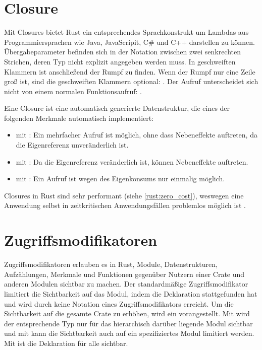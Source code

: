 \section{Closure}
\label{rust:closures}

Mit Closures bietet Rust ein entsprechendes Sprachkonstrukt um Lambdas aus Programmiersprachen wie Java, JavaScripit, C\# und C++ darstellen zu können.
Übergabeparameter befinden sich in der Notation zwischen zwei senkrechten Strichen, deren Typ nicht explizit angegeben werden muss.
In geschweiften Klammern ist anschließend der Rumpf zu finden.
Wenn der Rumpf nur eine Zeile groß ist, sind die geschweiften Klammern optional: .
Der Aufruf unterscheidet sich nicht von einem normalen Funktionsaufruf: .

Eine Closure ist eine automatisch generierte Datenstruktur, die eines der folgenden Merkmale automatisch implementiert:
\begin{itemize}
	\item {} mit : Ein mehrfacher Aufruf ist möglich, ohne dass Nebeneffekte auftreten, da die Eigenreferenz unveränderlich ist.
	\item {} mit : Da die Eigenreferenz veränderlich ist, können Nebeneffekte auftreten.
	\item {} mit : Ein Aufruf ist wegen des Eigenkonsums nur einmalig möglich.
\end{itemize}

Closures in Rust sind sehr performant (siehe \autoref{rust:zero_cost}), weswegen eine Anwendung selbst in zeitkritischen Anwendungsfällen problemlos möglich ist \cite[310]{rust:orly_programming}.



\section{Zugriffsmodifikatoren}
\label{rust:access_modifier}

Zugriffsmodifikatoren erlauben es in Rust, Module, Datenstrukturen, Aufzählungen, Merkmale und Funktionen gegenüber Nutzern einer Crate und anderen Modulen sichtbar zu machen.
Der standardmäßige Zugriffsmodifikator limitiert die Sichtbarkeit auf das Modul, indem die Deklaration stattgefunden hat und wird durch keine Notation eines Zugriffsmodifikators erreicht.
Um die Sichtbarkeit auf die gesamte Crate zu erhöhen, wird ein  vorangestellt.
Mit  wird der entsprechende Typ nur für das hierarchisch darüber liegende Modul sichtbar und mit  kann die Sichtbarkeit auch auf ein spezifiziertes Modul limitiert werden.
Mit  ist die Deklaration für alle sichtbar.

